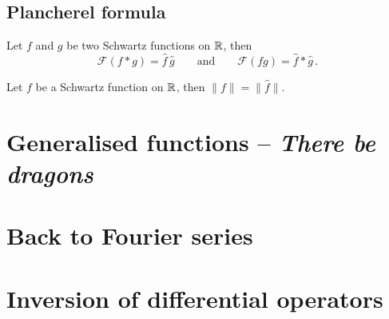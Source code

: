 \subsection{Plancherel formula}
\begin{theorem}
  Let $f$ and $g$ be two Schwartz functions on $\mathbb{R}$, then
  \begin{equation}
    \mathcal{F}(f\ast g)=\hat{f}\,\hat{g}\qquad\text{and}\qquad
    \mathcal{F}(fg)=\hat{f}\ast\hat{g}\,.
  \end{equation}
\end{theorem}
\begin{theorem}[Plancherel]
  Let $f$ be a Schwartz function on $\mathbb{R}$, then $\|f\|=\|\hat{f}\|$.
\end{theorem}
\section{Generalised functions -- \textit{There be dragons}}
\section{Back to Fourier series}
\section{Inversion of differential operators}